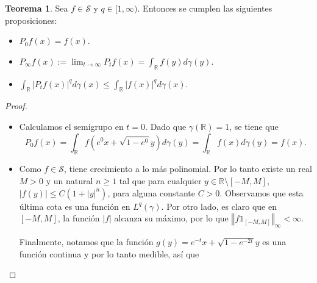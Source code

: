 \documentclass[letterpaper,twoside,12pt]{book}
\newcommand{\R}{\mathbb{R}}
\renewcommand{\S}{\mathcal{S}}
\newcommand{\1}{\mathds{1}}
\newcommand{\abs}[1]{\left\lvert #1 \right\rvert}
\renewcommand{\to}{\rightarrow}
\newcommand{\norm}[1]{\left\Vert #1 \right\Vert}
\theoremstyle{definition}
\theoremstyle{definition}
\newtheorem{teo}{Teorema}
\theoremstyle{definition}
\theoremstyle{definition}
\theoremstyle{definition}
\theoremstyle{definition}
\theoremstyle{definition}
\begin{document}
\begin{teo}
    Sea $f\in \mathcal{S}$ y $q\in [1,\infty)$. Entonces se cumplen las siguientes proposiciones:
    \begin{itemize}
        \item $P_0f(x)=f(x)$.
        \item $P_\infty f(x):=\displaystyle\lim_{t\to\infty}P_tf(x)=\int_\R f(y)d\gamma(y)$.
        \item $\displaystyle\int_\R \abs{P_tf(x)}^qd\gamma(x)\leq \int_\R\abs{f(x)}^qd\gamma(x)$.
    \end{itemize}
\end{teo}
\begin{proof} 
   \begin{itemize}
    \item  Calculamos el semigrupo en $t=0$. Dado que $\gamma(\R)=1$, se tiene que 
     \[
     P_0f(x)=\int_\R f\left(e^{0}x+\sqrt{1-e^{0}}y\right)d\gamma(y)=\int_\R f(x)d\gamma(y)=f(x).
     \]
     \item Como $f\in \S$, tiene crecimiento a lo más polinomial. Por lo tanto existe un real $M>0$ y un natural $n\geq1$ tal que para cualquier $y\in \R\setminus[-M,M]$, $|f(y)|\leq C(1+|y|^n)$, para alguna constante $C>0$. Observamos que esta última cota es una función en $L^q(\gamma)$. Por otro lado, es claro que en $[-M,M]$, la función $|f|$ alcanza su máximo, por lo que $\norm{f\1_{[-M,M]}}_\infty<\infty$. 
     
     Finalmente, notamos que la función $g(y)=e^{-t}x+\sqrt{1-e^{-2t}}y$ es una función continua y por lo tanto medible, así que
     

\end{itemize}
\end{proof}
\end{document}
